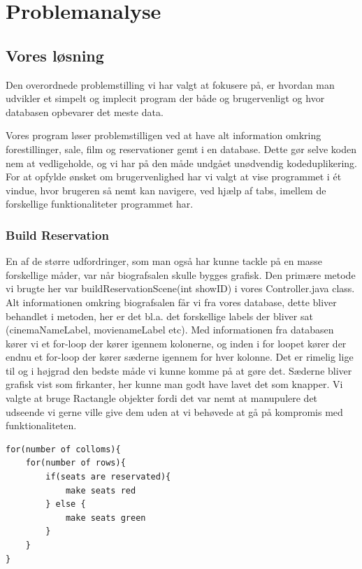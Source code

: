\documentclass[final]{report}
\begin{document}
\chapter{Problemanalyse}

\section{Vores løsning}
Den overordnede problemstilling vi har valgt at fokusere på, er hvordan man udvikler et simpelt og implecit program der både og brugervenligt og hvor databasen opbevarer det meste data. 

Vores program løser problemstilligen ved at have alt information omkring forestillinger, sale, film og reservationer gemt i en database. Dette gør selve koden nem at vedligeholde, og vi har på den måde undgået unødvendig kodeduplikering. For at opfylde ønsket om brugervenlighed har vi valgt at vise programmet i ét vindue, hvor brugeren så nemt kan navigere, ved hjælp af tabs, imellem de forskellige funktionaliteter programmet har.

\subsection{Build Reservation}
En af de større udfordringer, som man også har kunne tackle på en masse forskellige måder, var når biografsalen skulle bygges grafisk. Den primære metode vi brugte her var buildReservationScene(int showID) i vores Controller.java class. Alt informationen omkring biografsalen får vi fra vores database, dette bliver behandlet i metoden, her er det bl.a. det forskellige labels der bliver sat (cinemaNameLabel, movienameLabel etc). Med informationen fra databasen kører vi et for-loop der kører igennem kolonerne, og inden i for loopet kører der endnu et for-loop der kører sæderne igennem for hver kolonne. Det er rimelig lige til og i højgrad den bedste måde vi kunne komme på at gøre det. Sæderne bliver grafisk vist som firkanter, her kunne man godt have lavet det som knapper. Vi valgte at bruge Ractangle objekter fordi det var nemt at manupulere det udseende vi gerne ville give dem uden at vi behøvede at gå på kompromis med funktionaliteten.

\begin{verbatim}
for(number of colloms){
    for(number of rows){
        if(seats are reservated){
            make seats red
        } else {
            make seats green
        }
    }
}
\end{verbatim}
\end{document}
